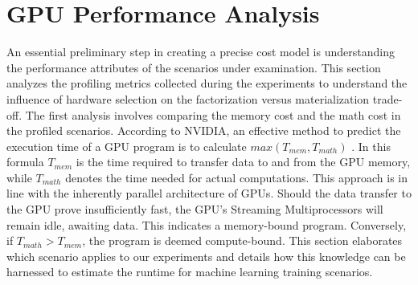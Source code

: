 \section{GPU Performance Analysis}
\label{sec:5-gpu-performance-analysis}
An essential preliminary step in creating a precise cost model is understanding the performance attributes of the scenarios under examination. This section analyzes the profiling metrics collected during the experiments to understand the influence of hardware selection on the factorization versus materialization trade-off. The first analysis involves comparing the memory cost and the math cost in the profiled scenarios. According to NVIDIA, an effective method to predict the execution time of a GPU program is to calculate $max(T_{mem}, T_{math})$ \cite{nvidia-gpu-performance:online}. In this formula $T_{mem}$ is the time required to transfer data to and from the GPU memory, while $T_{math}$ denotes the time needed for actual computations. This approach is in line with the inherently parallel architecture of GPUs. Should the data transfer to the GPU prove insufficiently fast, the GPU's Streaming Multiprocessors will remain idle, awaiting data. This indicates a memory-bound program. Conversely, if $T_{math} > T_{mem}$, the program is deemed compute-bound. This section elaborates which scenario applies to our experiments and details how this knowledge can be harnessed to estimate the runtime for machine learning training scenarios.

